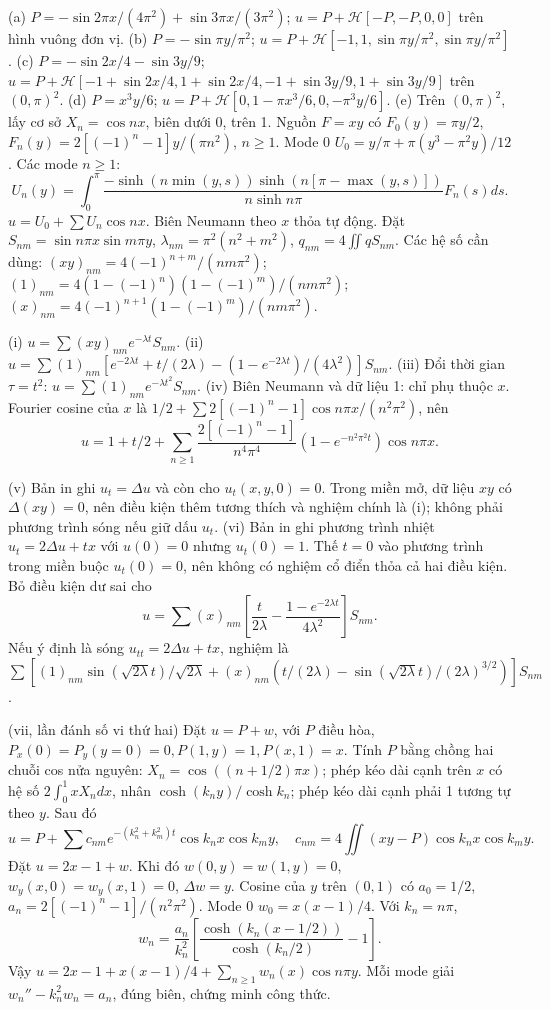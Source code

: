 (a) $P=-\sin2\pi x/(4\pi^2)+\sin3\pi x/(3\pi^2)$; $u=P+\mathcal H[-P,-P,0,0]$ trên hình vuông đơn vị.
(b) $P=-\sin\pi y/\pi^2$; $u=P+\mathcal H[-1,1,\sin\pi y/\pi^2,\sin\pi y/\pi^2]$.
(c) $P=-\sin2x/4-\sin3y/9$; $u=P+\mathcal H[-1+\sin2x/4,1+\sin2x/4,-1+\sin3y/9,1+\sin3y/9]$ trên $(0,\pi)^2$.
(d) $P=x^3y/6$; $u=P+\mathcal H[0,1-\pi x^3/6,0,-\pi^3y/6]$.
(e) Trên $(0,\pi)^2$, lấy cơ sở $X_n=\cos nx$, biên dưới 0, trên 1. Nguồn $F=xy$ có $F_0(y)=\pi y/2$, $F_n(y)=2[(-1)^n-1]y/(\pi n^2)$, $n\ge1$. Mode 0 $U_0=y/\pi+\pi(y^3-\pi^2y)/12$. Các mode $n\ge1$:
\[U_n(y)=\int_0^\pi\frac{-\sinh(n\min(y,s))\sinh(n[\pi-\max(y,s)])}{n\sinh n\pi}F_n(s)ds.\]
$u=U_0+\sum U_n\cos nx$. Biên Neumann theo $x$ thỏa tự động.
Đặt $S_{nm}=\sin n\pi x\sin m\pi y$, $\lambda_{nm}=\pi^2(n^2+m^2)$, $q_{nm}=4\iint qS_{nm}$. Các hệ số cần dùng: $(xy)_{nm}=4(-1)^{n+m}/(nm\pi^2)$; $(1)_{nm}=4(1-(-1)^n)(1-(-1)^m)/(nm\pi^2)$; $(x)_{nm}=4(-1)^{n+1}(1-(-1)^m)/(nm\pi^2)$.

(i) $u=\sum(xy)_{nm}e^{-\lambda t}S_{nm}$.
(ii) $u=\sum(1)_{nm}[e^{-2\lambda t}+t/(2\lambda)-(1-e^{-2\lambda t})/(4\lambda^2)]S_{nm}$.
(iii) Đổi thời gian $\tau=t^2$: $u=\sum(1)_{nm}e^{-\lambda t^2}S_{nm}$.
(iv) Biên Neumann và dữ liệu 1: chỉ phụ thuộc $x$. Fourier cosine của $x$ là $1/2+\sum 2[(-1)^n-1]\cos n\pi x/(n^2\pi^2)$, nên
\[u=1+t/2+\sum_{n\ge1}\frac{2[(-1)^n-1]}{n^4\pi^4}(1-e^{-n^2\pi^2t})\cos n\pi x.\]

(v) Bản in ghi $u_t=\Delta u$ và còn cho $u_t(x,y,0)=0$. Trong miền mở, dữ liệu $xy$ có $\Delta(xy)=0$, nên điều kiện thêm tương thích và nghiệm chính là (i); không phải phương trình sóng nếu giữ dấu $u_t$.
(vi) Bản in ghi phương trình nhiệt $u_t=2\Delta u+tx$ với $u(0)=0$ nhưng $u_t(0)=1$. Thế $t=0$ vào phương trình trong miền buộc $u_t(0)=0$, nên không có nghiệm cổ điển thỏa cả hai điều kiện. Bỏ điều kiện dư sai cho
\[u=\sum(x)_{nm}\left[\frac t{2\lambda}-\frac{1-e^{-2\lambda t}}{4\lambda^2}\right]S_{nm}.\]
Nếu ý định là sóng $u_{tt}=2\Delta u+tx$, nghiệm là $\sum[(1)_{nm}\sin(\sqrt{2\lambda}t)/\sqrt{2\lambda}+(x)_{nm}(t/(2\lambda)-\sin(\sqrt{2\lambda}t)/(2\lambda)^{3/2})]S_{nm}$.

(vii, lần đánh số vi thứ hai) Đặt $u=P+w$, với $P$ điều hòa, $P_x(0)=P_y(y=0)=0,P(1,y)=1,P(x,1)=x$. Tính $P$ bằng chồng hai chuỗi cos nửa nguyên: $X_n=\cos((n+1/2)\pi x)$; phép kéo dài cạnh trên $x$ có hệ số $2\int_0^1xX_n dx$, nhân $\cosh(k_ny)/\cosh k_n$; phép kéo dài cạnh phải 1 tương tự theo $y$. Sau đó
\[u=P+\sum c_{nm}e^{-(k_n^2+k_m^2)t}\cos k_nx\cos k_my,\quad c_{nm}=4\iint(xy-P)\cos k_nx\cos k_my.\]
Đặt $u=2x-1+w$. Khi đó $w(0,y)=w(1,y)=0$, $w_y(x,0)=w_y(x,1)=0$, $\Delta w=y$. Cosine của $y$ trên $(0,1)$ có $a_0=1/2$, $a_n=2[(-1)^n-1]/(n^2\pi^2)$. Mode 0 $w_0=x(x-1)/4$. Với $k_n=n\pi$,
\[w_n=\frac{a_n}{k_n^2}\left[\frac{\cosh(k_n(x-1/2))}{\cosh(k_n/2)}-1\right].\]
Vậy $u=2x-1+x(x-1)/4+\sum_{n\ge1}w_n(x)\cos n\pi y$. Mỗi mode giải $w_n''-k_n^2w_n=a_n$, đúng biên, chứng minh công thức.
